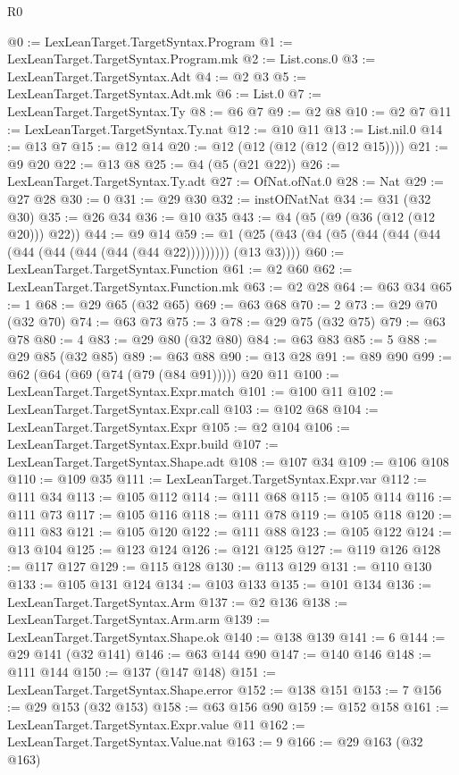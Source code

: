 \begin{lexlean}{R0}
\begin{coremodule}
@0 := LexLeanTarget.TargetSyntax.Program
@1 := LexLeanTarget.TargetSyntax.Program.mk
@2 := List.cons.{0}
@3 := LexLeanTarget.TargetSyntax.Adt
@4 := @2 @3
@5 := LexLeanTarget.TargetSyntax.Adt.mk
@6 := List.{0}
@7 := LexLeanTarget.TargetSyntax.Ty
@8 := @6 @7
@9 := @2 @8
@10 := @2 @7
@11 := LexLeanTarget.TargetSyntax.Ty.nat
@12 := @10 @11
@13 := List.nil.{0}
@14 := @13 @7
@15 := @12 @14
@20 := @12 (@12 (@12 (@12 (@12 @15))))
@21 := @9 @20
@22 := @13 @8
@25 := @4 (@5 (@21 @22))
@26 := LexLeanTarget.TargetSyntax.Ty.adt
@27 := OfNat.ofNat.{0}
@28 := Nat
@29 := @27 @28
@30 := 0
@31 := @29 @30
@32 := instOfNatNat
@34 := @31 (@32 @30)
@35 := @26 @34
@36 := @10 @35
@43 := @4 (@5 (@9 (@36 (@12 (@12 @20))) @22))
@44 := @9 @14
@59 := @1 (@25 (@43 (@4 (@5 (@44 (@44 (@44 (@44 (@44 (@44 (@44 (@44 @22))))))))) (@13 @3))))
@60 := LexLeanTarget.TargetSyntax.Function
@61 := @2 @60
@62 := LexLeanTarget.TargetSyntax.Function.mk
@63 := @2 @28
@64 := @63 @34
@65 := 1
@68 := @29 @65 (@32 @65)
@69 := @63 @68
@70 := 2
@73 := @29 @70 (@32 @70)
@74 := @63 @73
@75 := 3
@78 := @29 @75 (@32 @75)
@79 := @63 @78
@80 := 4
@83 := @29 @80 (@32 @80)
@84 := @63 @83
@85 := 5
@88 := @29 @85 (@32 @85)
@89 := @63 @88
@90 := @13 @28
@91 := @89 @90
@99 := @62 (@64 (@69 (@74 (@79 (@84 @91))))) @20 @11
@100 := LexLeanTarget.TargetSyntax.Expr.match
@101 := @100 @11
@102 := LexLeanTarget.TargetSyntax.Expr.call
@103 := @102 @68
@104 := LexLeanTarget.TargetSyntax.Expr
@105 := @2 @104
@106 := LexLeanTarget.TargetSyntax.Expr.build
@107 := LexLeanTarget.TargetSyntax.Shape.adt
@108 := @107 @34
@109 := @106 @108
@110 := @109 @35
@111 := LexLeanTarget.TargetSyntax.Expr.var
@112 := @111 @34
@113 := @105 @112
@114 := @111 @68
@115 := @105 @114
@116 := @111 @73
@117 := @105 @116
@118 := @111 @78
@119 := @105 @118
@120 := @111 @83
@121 := @105 @120
@122 := @111 @88
@123 := @105 @122
@124 := @13 @104
@125 := @123 @124
@126 := @121 @125
@127 := @119 @126
@128 := @117 @127
@129 := @115 @128
@130 := @113 @129
@131 := @110 @130
@133 := @105 @131 @124
@134 := @103 @133
@135 := @101 @134
@136 := LexLeanTarget.TargetSyntax.Arm
@137 := @2 @136
@138 := LexLeanTarget.TargetSyntax.Arm.arm
@139 := LexLeanTarget.TargetSyntax.Shape.ok
@140 := @138 @139
@141 := 6
@144 := @29 @141 (@32 @141)
@146 := @63 @144 @90
@147 := @140 @146
@148 := @111 @144
@150 := @137 (@147 @148)
@151 := LexLeanTarget.TargetSyntax.Shape.error
@152 := @138 @151
@153 := 7
@156 := @29 @153 (@32 @153)
@158 := @63 @156 @90
@159 := @152 @158
@161 := LexLeanTarget.TargetSyntax.Expr.value @11
@162 := LexLeanTarget.TargetSyntax.Value.nat
@163 := 9
@166 := @29 @163 (@32 @163)

\end{coremodule}
\end{lexlean}
